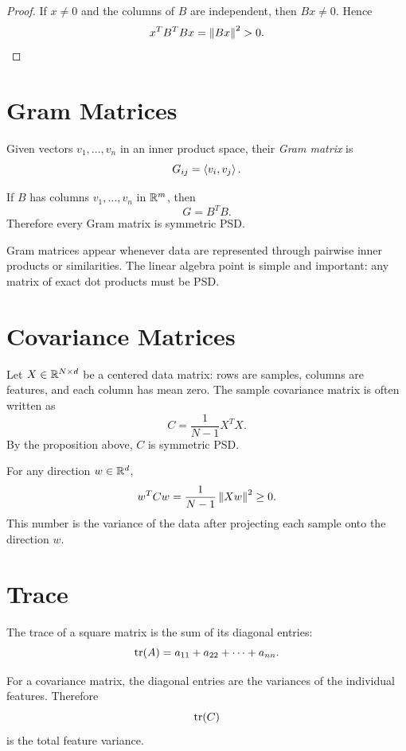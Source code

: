 \begin{proof}
If $x\neq 0$ and the columns of $B$ are independent, then $Bx\neq 0$. Hence
\[
  x^TB^TBx=\left\lVert Bx \right\rVert^2>0.
\]
\end{proof}

\section{Gram Matrices}

\begin{definition}
Given vectors $v_1,\ldots,v_n$ in an inner product space, their \emph{Gram
matrix} is
\[
  G_{ij}=\left\langle v_i,v_j \right\rangle.
\]
\end{definition}

If $B$ has columns $v_1,\ldots,v_n$ in $\mathbb{R}^m$, then
\[
  G=B^TB.
\]
Therefore every Gram matrix is symmetric PSD.

\begin{aimlbox}
Gram matrices appear whenever data are represented through pairwise inner
products or similarities. The linear algebra point is simple and important:
any matrix of exact dot products must be PSD.
\end{aimlbox}

\section{Covariance Matrices}

Let $X\in\mathbb{R}^{N\times d}$ be a centered data matrix: rows are samples, columns
are features, and each column has mean zero. The sample covariance matrix is
often written as
\[
  C=\frac{1}{N-1}X^TX.
\]
By the proposition above, $C$ is symmetric PSD.

For any direction $w\in\mathbb{R}^d$,
\[
  w^TCw=\frac{1}{N-1}\left\lVert Xw \right\rVert^2\geq 0.
\]
This number is the variance of the data after projecting each sample onto the
direction $w$.

\section{Trace}

\begin{definition}[Trace]
The trace of a square matrix is the sum of its diagonal entries:
\[
  \operatorname{tr}(A)=a_{11}+a_{22}+\cdots+a_{nn}.
\]
\end{definition}

For a covariance matrix, the diagonal entries are the variances of the
individual features. Therefore
\[
  \operatorname{tr}(C)
\]
is the total feature variance.

